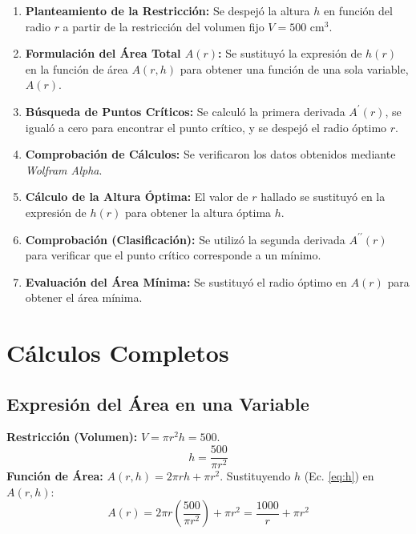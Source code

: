 \documentclass[12pt]{article}  %
\begin{document}
\begin{enumerate}
 \item \textbf{Planteamiento de la Restricción:} Se despejó la altura $h$ en función del radio $r$ a partir de la restricción del volumen fijo $V=500\text{ cm}^3$.
 \item \textbf{Formulación del Área Total $A(r)$:} Se sustituyó la expresión de $h(r)$ en la función de área $A(r,h)$ para obtener una función de una sola variable, $A(r)$.
 \item \textbf{Búsqueda de Puntos Críticos:} Se calculó la primera derivada $A^{\prime}(r)$, se igualó a cero para encontrar el punto crítico, y se despejó el radio óptimo $r$.
 \item \textbf{Comprobación de Cálculos:} Se verificaron los datos obtenidos mediante \textit{Wolfram Alpha}.
 \item \textbf{Cálculo de la Altura Óptima:} El valor de $r$ hallado se sustituyó en la expresión de $h(r)$ para obtener la altura óptima $h$.
 \item \textbf{Comprobación (Clasificación):} Se utilizó la segunda derivada $A^{\prime\prime}(r)$ para verificar que el punto crítico corresponde a un mínimo.
 \item \textbf{Evaluación del Área Mínima:} Se sustituyó el radio óptimo en $A(r)$ para obtener el área mínima.
\end{enumerate}

\section{Cálculos Completos}

\subsection{Expresión del Área en una Variable}
\textbf{Restricción (Volumen):} $V=\pi r^{2}h=500$.
\begin{equation}
 h = \frac{500}{\pi r^{2}} \label{eq:h}
\end{equation}
\textbf{Función de Área:} $A(r,h)=2\pi rh+\pi r^{2}$.
Sustituyendo $h$ (Ec. \ref{eq:h}) en $A(r,h)$:
\begin{equation}
 A(r) = 2\pi r \left( \frac{500}{\pi r^{2}} \right) + \pi r^{2} = \frac{1000}{r} + \pi r^{2}
\end{equation}
\end{document}
